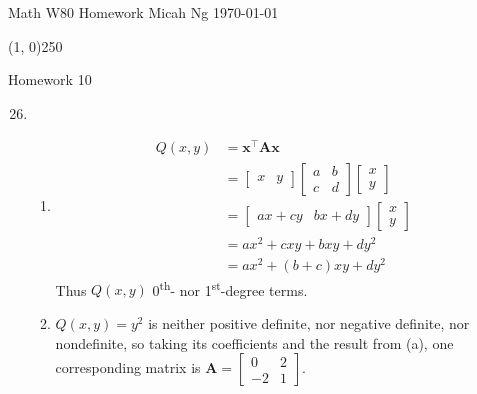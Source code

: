 \documentclass[11pt,letterpaper]{article}
\begin{document}
\noindent
Math W80 Homework \hfill Micah Ng \hfill \today

\begin{center}
\line(1, 0){250}
\end{center}

\noindent
Homework 10

\begin{enumerate}
\setcounter{enumi}{25}
\item
  \begin{enumerate}
  \item
    \begin{align*}
      Q(x,y) &= \mathbf{x}^\top\mathbf{A}\mathbf{x} \\
          &= \begin{bmatrix} x & y \end{bmatrix}
             \begin{bmatrix} a & b \\ c & d \end{bmatrix}
             \begin{bmatrix} x \\ y \end{bmatrix} \\
          &= \begin{bmatrix} ax+cy & bx+dy \end{bmatrix}
             \begin{bmatrix} x \\ y \end{bmatrix} \\
          &= ax^2+cxy+bxy+dy^2 \\
          &= ax^2+(b+c)xy+dy^2
    \end{align*}
    Thus $Q(x,y)$ 0\textsuperscript{th}- nor 1\textsuperscript{st}-degree
    terms.

  \item
    $Q(x,y)=y^2$ is neither positive definite, nor negative definite, nor
    nondefinite, so taking its coefficients and the result from (a), one
    corresponding matrix is
    $\mathbf{A}=\left[\begin{smallmatrix} 0 & 2 \\ -2 & 1 \end{smallmatrix}\right]$.
  \end{enumerate}


\end{enumerate}
\end{document}

